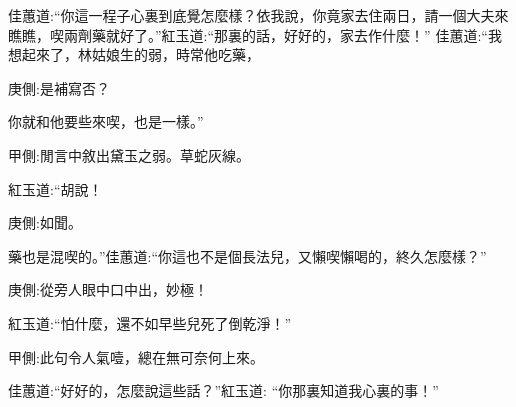 \begin{parag}
    佳蕙道:“你這一程子心裏到底覺怎麼樣？依我說，你竟家去住兩日，請一個大夫來瞧瞧，喫兩劑藥就好了。”紅玉道:“那裏的話，好好的，家去作什麼！” 佳蕙道:“我想起來了，林姑娘生的弱，時常他吃藥，\begin{note}庚側:是補寫否？\end{note}你就和他要些來喫，也是一樣。”\begin{note}甲側:閒言中敘出黛玉之弱。草蛇灰線。\end{note}紅玉道:“胡說！\begin{note}庚側:如聞。\end{note}藥也是混喫的。”佳蕙道:“你這也不是個長法兒，又懶喫懶喝的，終久怎麼樣？”\begin{note}庚側:從旁人眼中口中出，妙極！\end{note}紅玉道:“怕什麼，還不如早些兒死了倒乾淨！”\begin{note}甲側:此句令人氣噎，總在無可奈何上來。\end{note}佳蕙道:“好好的，怎麼說這些話？”紅玉道: “你那裏知道我心裏的事！”
\end{parag}


